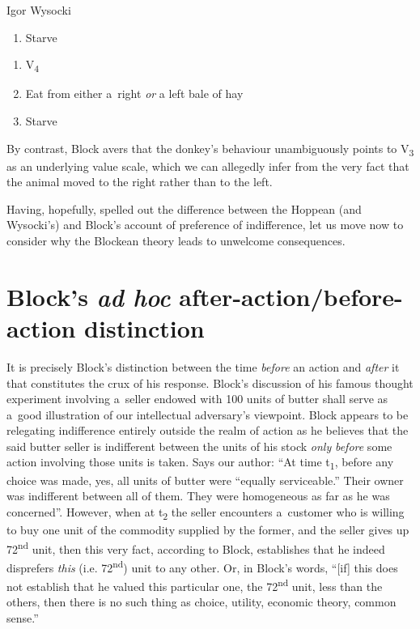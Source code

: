 \begin{artengenv}{Igor Wysocki}
\begin{enumerate}[label=(\arabic*)]
\item Starve

\end{enumerate}

\pagebreak[2]



\begin{enumerate}[label=(\arabic*)]
\item[]\makebox[-1.7em][l]{}V\textsubscript{4}
\item Eat from either a~right \textit{or} a left bale of hay
\item Starve
\end{enumerate}

By contrast, Block avers that the donkey's behaviour unambiguously points to V\textsubscript{3} as an underlying value scale, which we can allegedly infer from the very fact that the animal moved to the right rather than to the left.



Having, hopefully, spelled out the difference between the Hoppean (and Wysocki's) and Block's account of preference of indifference, let us move now to consider why the Blockean theory leads to unwelcome consequences.



\section{Block's \textit{ad hoc} after-action/before-action distinction }

It is precisely Block's distinction between the time \textit{before} an action and \textit{after} it that constitutes the crux of his response. Block's 
\parencite*[][p.52]{block_response_2022} %
 discussion of his famous thought experiment involving a~seller endowed with 100 units of butter shall serve as a~good illustration of our intellectual adversary's viewpoint. Block appears to be relegating indifference entirely outside the realm of action as he believes that the said butter seller is indifferent between the units of his stock \textit{only} \textit{before} some action involving those units is taken. Says our author: ``At time t\textsubscript{1}, before any choice was made, yes, all units of butter were ``equally serviceable.'' Their owner was indifferent between all of them. They were homogeneous as far as he was concerned''. However, when at t\textsubscript{2} the seller encounters a~customer who is willing to buy one unit of the commodity supplied by the former, and the seller gives up 72\textsuperscript{nd }unit, then this very fact, according to Block, establishes that he indeed disprefers \textit{this} (i.e. 72\textsuperscript{nd}) unit to any other. Or, in Block's words, ``[if] this does not establish that he valued this particular one, the 72\textsuperscript{nd} unit, less than the others, then there is no such thing as choice, utility, economic theory, common sense.''




\end{artengenv}
